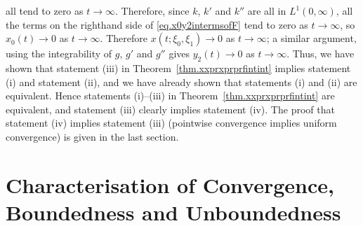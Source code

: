 \documentclass[10pt,reqno]{amsart}
\theoremstyle{definition}
\begin{document}
	all tend to zero as $t\to\infty$. Therefore, since $k$, $k'$ and $k''$ are all in $L^1(0,\infty)$, all the terms on the righthand side of \eqref{eq.x0y2intermsofF} tend to zero as $t\to\infty$, so $x_0(t)\to 0$ as $t\to\infty$. Therefore $x(t;\xi_0,\xi_1)\to 0$ as $t\to\infty$; a similar argument, using the integrability of $g$, $g'$ and $g''$ gives $y_2(t)\to 0$ as $t\to\infty$. Thus, we have shown that statement (iii) in Theorem~\ref{thm.xxprxprprfintint} implies statement (i) and statement (ii), and we have already shown that statements (i) and (ii) are equivalent. Hence statements (i)--(iii) in Theorem~\ref{thm.xxprxprprfintint} are equivalent, and statement (iii) clearly implies statement (iv). The proof that statement (iv) implies statement (iii) (pointwise convergence implies uniform convergence) is given in the last section. 
	
	\section{Characterisation of Convergence, Boundedness and Unboundedness} 
	
\end{document}
